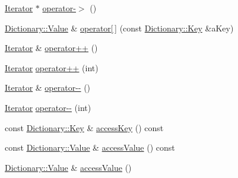 \begin{DoxyCompactItemize}
\item 
\mbox{\hyperlink{classlibrary_1_1core_1_1ctnr_1_1_dictionary_1_1_iterator}{Iterator}} $\ast$ \mbox{\hyperlink{classlibrary_1_1core_1_1ctnr_1_1_dictionary_1_1_iterator_a0cb70d2bc0b4cb3e56bb3c951651ee93}{operator-\/$>$}} ()
\item 
\mbox{\hyperlink{classlibrary_1_1core_1_1ctnr_1_1_dictionary_a3baf6692694e4fc27cb399ac083c88ea}{Dictionary\+::\+Value}} \& \mbox{\hyperlink{classlibrary_1_1core_1_1ctnr_1_1_dictionary_1_1_iterator_a74b081965e71a2169245e43e7a4aff98}{operator\mbox{[}$\,$\mbox{]}}} (const \mbox{\hyperlink{classlibrary_1_1core_1_1ctnr_1_1_dictionary_a987cae687cce70d81a2a483c5e05e842}{Dictionary\+::\+Key}} \&a\+Key)
\item 
\mbox{\hyperlink{classlibrary_1_1core_1_1ctnr_1_1_dictionary_1_1_iterator}{Iterator}} \& \mbox{\hyperlink{classlibrary_1_1core_1_1ctnr_1_1_dictionary_1_1_iterator_a2eb9ccc780b8aa7feb115902f7f94d71}{operator++}} ()
\item 
\mbox{\hyperlink{classlibrary_1_1core_1_1ctnr_1_1_dictionary_1_1_iterator}{Iterator}} \mbox{\hyperlink{classlibrary_1_1core_1_1ctnr_1_1_dictionary_1_1_iterator_a851abe701afa60b022cc605cb8d7aa65}{operator++}} (int)
\item 
\mbox{\hyperlink{classlibrary_1_1core_1_1ctnr_1_1_dictionary_1_1_iterator}{Iterator}} \& \mbox{\hyperlink{classlibrary_1_1core_1_1ctnr_1_1_dictionary_1_1_iterator_a732946d08ce8c8760a9de73d28e9fd5a}{operator-\/-\/}} ()
\item 
\mbox{\hyperlink{classlibrary_1_1core_1_1ctnr_1_1_dictionary_1_1_iterator}{Iterator}} \mbox{\hyperlink{classlibrary_1_1core_1_1ctnr_1_1_dictionary_1_1_iterator_ab203c310eee79909f5288116a41b93eb}{operator-\/-\/}} (int)
\item 
const \mbox{\hyperlink{classlibrary_1_1core_1_1ctnr_1_1_dictionary_a987cae687cce70d81a2a483c5e05e842}{Dictionary\+::\+Key}} \& \mbox{\hyperlink{classlibrary_1_1core_1_1ctnr_1_1_dictionary_1_1_iterator_a497e1cae08345249e72a9824b5e6b779}{access\+Key}} () const
\item 
const \mbox{\hyperlink{classlibrary_1_1core_1_1ctnr_1_1_dictionary_a3baf6692694e4fc27cb399ac083c88ea}{Dictionary\+::\+Value}} \& \mbox{\hyperlink{classlibrary_1_1core_1_1ctnr_1_1_dictionary_1_1_iterator_a4e823ea437e2fd87cd754df2db87f21e}{access\+Value}} () const
\item 
\mbox{\hyperlink{classlibrary_1_1core_1_1ctnr_1_1_dictionary_a3baf6692694e4fc27cb399ac083c88ea}{Dictionary\+::\+Value}} \& \mbox{\hyperlink{classlibrary_1_1core_1_1ctnr_1_1_dictionary_1_1_iterator_ae0d3e2cab511ed5e25a44cd860dfb18e}{access\+Value}} ()

\end{DoxyCompactItemize}
